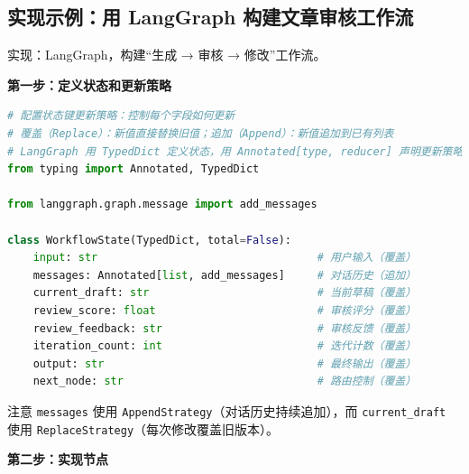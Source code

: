 \documentclass[9pt,a4paper,twocolumn]{ctexart}
\begin{document}
\subsection*{实现示例：用 LangGraph 构建文章审核工作流}


实现：LangGraph，构建“生成 → 审核 → 修改”工作流。



\textbf{第一步：定义状态和更新策略}



\begin{lstlisting}[language=Python]
# 配置状态键更新策略：控制每个字段如何更新
# 覆盖（Replace）：新值直接替换旧值；追加（Append）：新值追加到已有列表
# LangGraph 用 TypedDict 定义状态，用 Annotated[type, reducer] 声明更新策略
from typing import Annotated, TypedDict

from langgraph.graph.message import add_messages

class WorkflowState(TypedDict, total=False):
    input: str                                  # 用户输入（覆盖）
    messages: Annotated[list, add_messages]     # 对话历史（追加）
    current_draft: str                          # 当前草稿（覆盖）
    review_score: float                         # 审核评分（覆盖）
    review_feedback: str                        # 审核反馈（覆盖）
    iteration_count: int                        # 迭代计数（覆盖）
    output: str                                 # 最终输出（覆盖）
    next_node: str                              # 路由控制（覆盖）
\end{lstlisting}



注意 \texttt{messages} 使用 \texttt{AppendStrategy}（对话历史持续追加），而 \texttt{current\_draft} 使用 \texttt{ReplaceStrategy}（每次修改覆盖旧版本）。



\textbf{第二步：实现节点}
\end{document}
